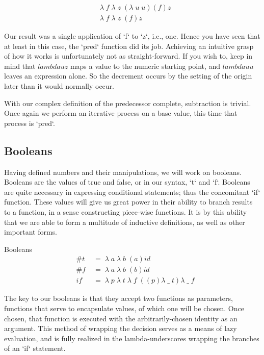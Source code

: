 \begin{align*}
& \lambda \; f \; \lambda \; z \; (\lambda \; u \; u)(f)z
\\& \lambda \; f \; \lambda \; z \; (f)z
\end{align*}

Our result was a single application of `f` to `z`, i.e., one. Hence you have seen 
that at least in this case, the `pred` function did its job. Achieving an
intuitive grasp of how it works is unfortunately not as straight-forward. If you
wish to, keep in mind that $lambda u z$ maps a value to the numeric starting
point, and $lambda u u$ leaves an expression alone. So the decrement occurs by
the setting of the origin later than it would normally occur.

With our complex definition of the predecessor complete, subtraction is trivial.
Once again we perform an iterative process on a base value, this time that process 
is `pred`.

\subsection{Booleans}
Having defined numbers and their manipulations, we will work on booleans. Booleans 
are the values of true and false, or in our syntax, `t` and `f`. Booleans are
quite necessary in expressing conditional statements; thus the concomitant `if`
function. These values will give us great power in their ability to branch results 
to a function, in a sense constructing piece-wise functions. It is by this ability 
that we are able to form a multitude of inductive definitions, as well as other 
important forms.

Booleans
\begin{align*}
& \#t \; &= \; \lambda \; a \; \lambda \; b \; (a)id
\\& \#f \; &= \; \lambda \; a \; \lambda \; b \; (b)id
\\& if \; &= \; \lambda \; p \; \lambda \; t \; \lambda \; f \; ((p)\lambda \; \_ \; t)\lambda \; \_ \; f
\end{align*}

The key to our booleans is that they accept two functions as parameters, functions 
that serve to encapsulate values, of which one will be chosen. Once chosen, that 
function is executed with the arbitrarily-chosen identity as an argument. This
method of wrapping the decision serves as a means of lazy evaluation, and is fully 
realized in the lambda-underscores wrapping the branches of an `if` statement.

